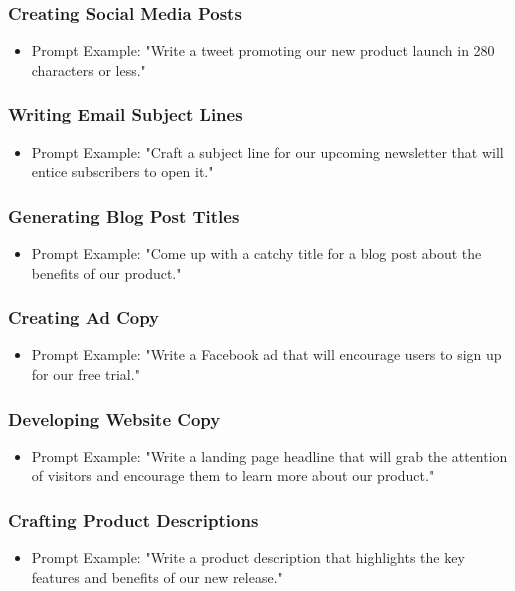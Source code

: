 \begin{frame}[fragile]\frametitle{Creating Social Media Posts}
\begin{itemize}
\item Prompt Example: "Write a tweet promoting our new product launch in 280 characters or less."
\end{itemize}
\end{frame}

\begin{frame}[fragile]\frametitle{Writing Email Subject Lines}
\begin{itemize}
\item Prompt Example: "Craft a subject line for our upcoming newsletter that will entice subscribers to open it."
\end{itemize}
\end{frame}

\begin{frame}[fragile]\frametitle{Generating Blog Post Titles}
\begin{itemize}
\item Prompt Example: "Come up with a catchy title for a blog post about the benefits of our product."
\end{itemize}
\end{frame}

\begin{frame}[fragile]\frametitle{Creating Ad Copy}
\begin{itemize}
\item Prompt Example: "Write a Facebook ad that will encourage users to sign up for our free trial."
\end{itemize}
\end{frame}

\begin{frame}[fragile]\frametitle{Developing Website Copy}
\begin{itemize}
\item Prompt Example: "Write a landing page headline that will grab the attention of visitors and encourage them to learn more about our product."
\end{itemize}
\end{frame}

\begin{frame}[fragile]\frametitle{Crafting Product Descriptions}
\begin{itemize}
\item Prompt Example: "Write a product description that highlights the key features and benefits of our new release."
\end{itemize}
\end{frame}

